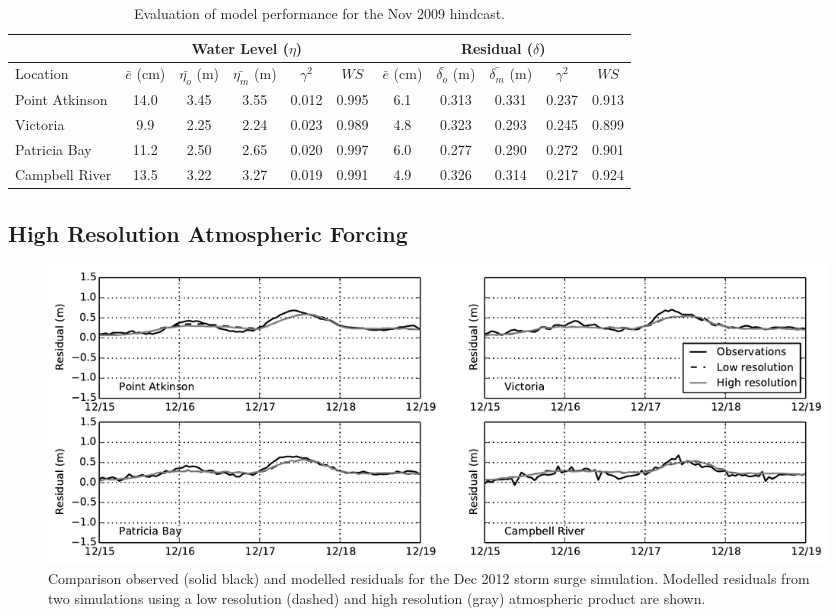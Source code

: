 \documentclass[pdftex,10pt]{article}
\begin{document}
\begin{table}[h]
\centering 
\begin{tabular}{|l |c c c c c | c c c c c|} 
\hline 
& \multicolumn{5}{|c|}{Water Level ($\eta$)}        & \multicolumn{5}{|c|}{Residual ($\delta$)} \\ 
\hline 
Location       & $\bar{e}$ (cm) & $\bar{\eta_{o}}$ (m) & $\bar{\eta_{m}}$ (m) & $\gamma^2$ & $WS$   & $\bar{e}$ (cm) & $\bar{\delta_{o}}$ (m) & $\bar{\delta_{m}}$ (m) & $\gamma^2$ & $WS$ \\
\hline 
Point Atkinson & 14.0           &  3.45                & 3.55                 &   0.012    & 0.995  &  6.1           &  0.313                 & 0.331                  &  0.237     & 0.913 \\
Victoria       &  9.9           &  2.25                & 2.24                 &   0.023    & 0.989  &  4.8           &  0.323                 & 0.293                  &  0.245     & 0.899 \\
Patricia Bay   & 11.2           &  2.50                & 2.65                 &   0.020    & 0.997  &  6.0           &  0.277                 & 0.290                  &  0.272     & 0.901 \\
Campbell River & 13.5           &  3.22                & 3.27                 &   0.019    & 0.991  &  4.9           &  0.326                 & 0.314                  &  0.217     & 0.924 \\
\hline 
\end{tabular}
\caption{Evaluation of model performance for the Nov 2009 hindcast.}
\label{tab:nov2009stat} 
\end{table}



\subsection{High Resolution Atmospheric Forcing}

\begin{figure}
\centering
\includegraphics[scale=0.6]{Figures/dec2012_surge.pdf}
\caption{Comparison observed (solid black) and modelled residuals for the Dec 2012 storm surge simulation. Modelled residuals from two simulations using a low resolution (dashed) and high resolution (gray) atmospheric product are shown. }
\label{fig:dec2012_surge}
\end{figure}
\end{document}
